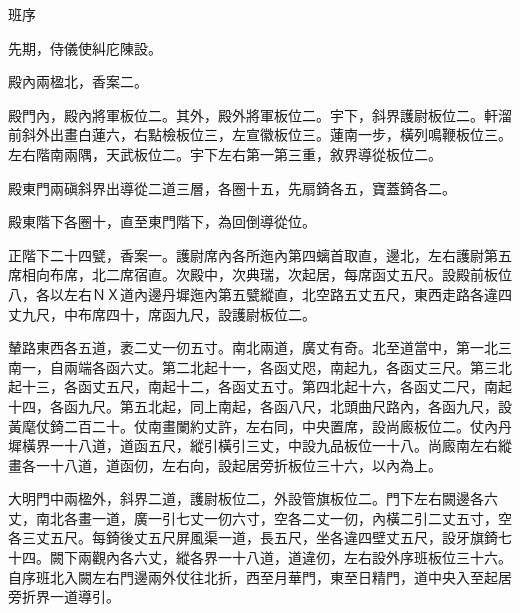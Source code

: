 \begin{pinyinscope}
 班序



 先期，侍儀使糾庀陳設。



 殿內兩楹北，香案二。



 殿門內，殿內將軍板位二。其外，殿外將軍板位二。宇下，斜界護尉板位二。軒溜前斜外出畫白蓮六，右點檢板位三，左宣徽板位三。蓮南一步，橫列鳴鞭板位三。左右階南兩隅，天武板位二。宇下左右第一第三重，敘界導從板位二。



 殿東門兩磌斜界出導從二道三層，各圈十五，先扇錡各五，寶蓋錡各二。



 殿東階下各圈十，直至東門階下，為回倒導從位。



 正階下二十四甓，香案一。護尉席內各所迤內第四螭首取直，邊北，左右護尉第五席相向布席，北二席宿直。次殿中，次典瑞，次起居，每席函丈五尺。設殿前板位八，各以左右ＮＸ道內邊丹墀迤內第五甓縱直，北空路五丈五尺，東西走路各違四丈九尺，中布席四十，席函九尺，設護尉板位二。



 輦路東西各五道，袤二丈一仞五寸。南北兩道，廣丈有奇。北至道當中，第一北三南一，自兩端各函六丈。第二北起十一，各函丈咫，南起九，各函丈三尺。第三北起十三，各函丈五尺，南起十二，各函丈五寸。第四北起十六，各函丈二尺，南起十四，各函九尺。第五北起，同上南起，各函八尺，北頭曲尺路內，各函九尺，設黃麾仗錡二百二十。仗南畫闌約丈許，左右同，中央置席，設尚廄板位二。仗內丹墀橫界一十八道，道函五尺，縱引橫引三丈，中設九品板位一十八。尚廄南左右縱畫各一十八道，道函仞，左右向，設起居旁折板位三十六，以內為上。



 大明門中兩楹外，斜界二道，護尉板位二，外設管旗板位二。門下左右闕邊各六丈，南北各畫一道，廣一引七丈一仞六寸，空各二丈一仞，內橫二引二丈五寸，空各三丈五尺。每錡後丈五尺屏風渠一道，長五尺，坐各違四壁丈五尺，設牙旗錡七十四。闕下兩觀內各六丈，縱各界一十八道，道違仞，左右設外序班板位三十六。自序班北入闕左右門邊兩外仗往北折，西至月華門，東至日精門，道中央入至起居旁折界一道導引。



\end{pinyinscope}
